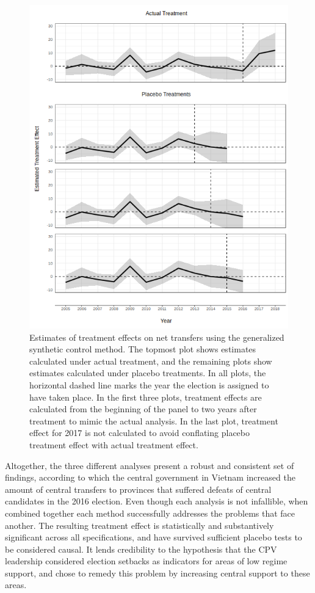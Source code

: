\documentclass[12pt]{article}
\newcommand{\1}{\mathbbm{1}}
\begin{document}
\begin{figure}[!htbp]
	\centering
	\includegraphics[height=.75\textheight]{figure/190311_synth_results.png}
	\captionsetup{singlelinecheck=off}
	\caption[Estimated synthetic control treatment effects]{Estimates of treatment effects on net transfers using the generalized synthetic control method. The topmost plot shows estimates calculated under actual treatment, and the remaining plots show estimates calculated under placebo treatments. In all plots, the horizontal dashed line marks the year the election is assigned to have taken place. In the first three plots, treatment effects are calculated from the beginning of the panel to two years after treatment to mimic the actual analysis. In the last plot, treatment effect for 2017 is not calculated to avoid conflating placebo treatment effect with actual treatment effect.}
	\label{fig:synth_placebo}
\end{figure}

Altogether, the three different analyses present a robust and consistent set of findings, according to which the central government in Vietnam increased the amount of central transfers to provinces that suffered defeats of central candidates in the 2016 election. Even though each analysis is not infallible, when combined together each method successfully addresses the problems that face another. The resulting treatment effect is statistically and substantively significant across all specifications, and have survived sufficient placebo tests to be considered causal. It lends credibility to the hypothesis that the CPV leadership considered election setbacks as indicators for areas of low regime support, and chose to remedy this problem by increasing central support to these areas.
\end{document}
